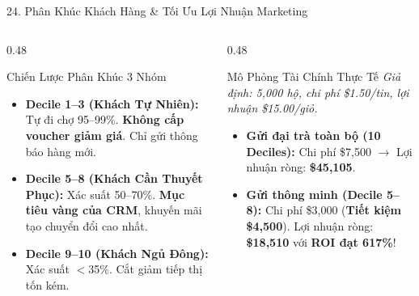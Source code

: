 \documentclass[aspectratio=169, 10pt]{beamer}
\begin{document}
\begin{frame}{24. Phân Khúc Khách Hàng \& Tối Ưu Lợi Nhuận Marketing}
  \begin{columns}[T]
    \begin{column}{0.48\textwidth}
      \begin{block}{Chiến Lược Phân Khúc 3 Nhóm}
        \begin{itemize}\setlength{\itemsep}{3pt}
          \item \textbf{Decile 1--3 (Khách Tự Nhiên):}
            Tự đi chợ 95--99\%. \textbf{Không cấp voucher giảm giá}. Chỉ gửi thông báo hàng mới.
          \item \textbf{Decile 5--8 (Khách Cần Thuyết Phục):}
            Xác suất 50--70\%. \textbf{Mục tiêu vàng của CRM}, khuyến mãi tạo chuyển đổi cao nhất.
          \item \textbf{Decile 9--10 (Khách Ngủ Đông):}
            Xác suất $<$35\%. Cắt giảm tiếp thị tốn kém.
        \end{itemize}
      \end{block}
    \end{column}
    \begin{column}{0.48\textwidth}
      \begin{exampleblock}{Mô Phỏng Tài Chính Thực Tế}
        \textit{Giả định: 5,000 hộ, chi phí \$1.50/tin, lợi nhuận \$15.00/giỏ.}
        \begin{itemize}\setlength{\itemsep}{3pt}
          \item \textbf{Gửi đại trà toàn bộ (10 Deciles):}
            Chi phí \$7,500 $\rightarrow$ Lợi nhuận ròng: \textbf{\$45,105}.
          \item \textbf{Gửi thông minh (Decile 5--8):}
            Chi phí \$3,000 (\textbf{Tiết kiệm \$4,500}).
            Lợi nhuận ròng: \textbf{\$18,510} với \textbf{ROI đạt 617\%}!
        \end{itemize}
      \end{exampleblock}
    \end{column}
  \end{columns}
\end{frame}
\end{document}
